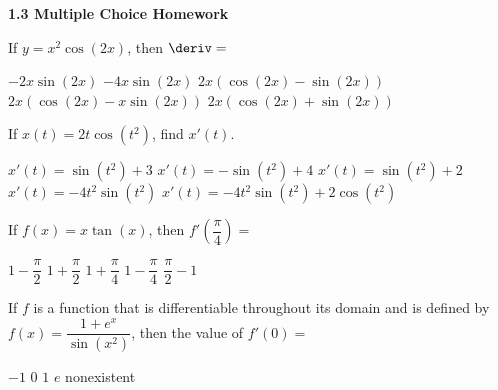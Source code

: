 \textbf{\large{1.3 Multiple Choice Homework}} \par

\begin{questions}
    \question If $y = x^2\cos (2x)$, then $\deriv = $ \\

    \begin{oneparchoices}
        \choice $-2x\sin (2x)$
        \choice $-4x\sin (2x)$
        \choice $2x\left(\cos (2x) - \sin (2x)\right)$ \\[11pt]
        \makebox[0.17 \textwidth] \choice $2x\left(\cos (2x) - x\sin (2x)\right)$
        \makebox[0.2 \textwidth] \choice $2x\left(\cos (2x) + \sin (2x)\right)$
    \end{oneparchoices} \par \horizontalline

    \question If $x(t) = 2t\cos \left(t^2\right)$, find $x'(t)$. \\

    \begin{oneparchoices}
        \choice $x'(t) = \sin \left(t^2\right) + 3$
        \choice $x'(t) = -\sin \left(t^2\right) + 4$ 
        \choice $x'(t) = \sin \left(t^2\right) + 2$ \\[11pt]
        \makebox[0.14 \textwidth] \choice $x'(t) = -4t^2\sin \left(t^2\right)$ 
        \makebox[0.15 \textwidth] \choice $x'(t) = -4t^2\sin \left(t^2\right) + 2\cos \left(t^2\right)$ 
    \end{oneparchoices} \par \horizontalline

    \question If $f(x) = x\tan (x)$, then $f'\left(\dfrac{\pi}{4}\right) = $ \\

    \begin{oneparchoices}
        \choice $1 - \dfrac{\pi}{2}$ 
        \choice $1 + \dfrac{\pi}{2}$
        \choice $1 + \dfrac{\pi}{4}$
        \choice $1 - \dfrac{\pi}{4}$ 
        \choice $\dfrac{\pi}{2} - 1$
    \end{oneparchoices} \par \horizontalline

    \question If $f$ is a function that is differentiable throughout its domain and is defined by $f(x) = \dfrac{1 + e^x}{\sin \left(x^2\right)}$, then the value of $f'(0) = $ \\

    \begin{oneparchoices}
        \choice $-1$ 
        \choice $0$
        \choice $1$
        \choice $e$
        \choice nonexistent
    \end{oneparchoices} \par \horizontalline
    

\end{questions}
